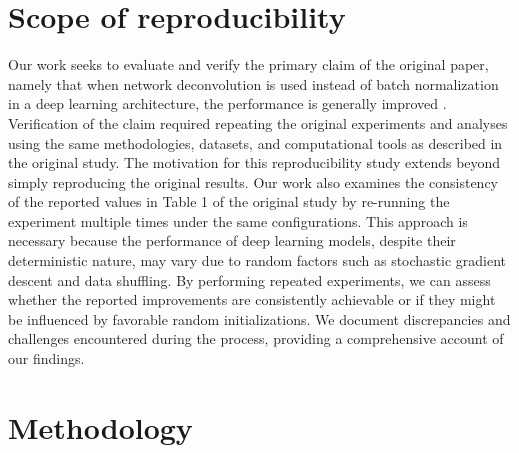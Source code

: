 \section{Scope of reproducibility}
\label{sec:claims}
Our work seeks to evaluate and verify the primary claim of the original paper, namely that when network deconvolution is used instead of batch normalization in a deep learning architecture, the performance is generally improved \cite{ye2020network}. Verification of the claim required repeating the original experiments and analyses using the same methodologies, datasets, and computational tools as described in the original study. 
The motivation for this reproducibility study extends beyond simply reproducing the original results. Our work also examines the consistency of the reported values in Table 1 of the original study by re-running the experiment multiple times under the same configurations. This approach is necessary because the performance of deep learning models, despite their deterministic nature, may vary due to random factors such as stochastic gradient descent and data shuffling. By performing repeated experiments, we can assess whether the reported improvements are consistently achievable or if they might be influenced by favorable random initializations. We document discrepancies and challenges encountered during the process, providing a comprehensive account of our findings.\\



\section{Methodology}



